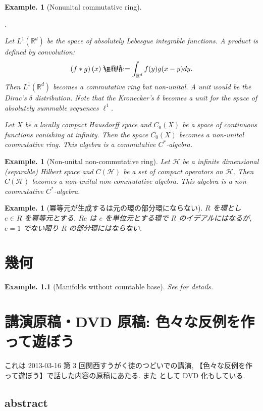 \documentclass[openany, a4paper, oneside]{jsbook}
\makeatletter
\newcounter{enum2}
\renewenvironment{enumerate}{%
\begin{list}%
{%
\arabic{enum2}.\ \,%
}%
{%
\usecounter{enum2}
\setlength{\itemindent}{0pt}%
\setlength{\leftmargin}{15pt}%
\setlength{\rightmargin}{0pt}%
\setlength{\labelsep}{0pt}%
\setlength{\labelwidth}{6pt}%
\setlength{\itemsep}{0pt}%
\setlength{\parsep}{0pt}%
\setlength{\listparindent}{0pt}%
}
}{%
\end{list}%
}
\newcommand*{\defeq}{\mathrel{\rlap{%
\raisebox{0.3ex}{$\m@th\cdot$}}%
\raisebox{-0.3ex}{$\m@th\cdot$}}%
=}
\theoremstyle{break}
\theoremstyle{breakdefn}
\newtheorem{ex}[thm]{Example.}
\newcommand{\rbk}[1]{\left (#1\right)}
\newcommand{\bbRd}{\mathbb{R}^d}
\newcommand{\calH}{\mathcal{H}}
\makeatother
\begin{document}
\begin{ex}[Nonunital commutative ring]
\begin{enumerate}
\item Let $L^1(\bbRd)$ be the space of absolutely Lebesgue integrable functions.
    A product is defined by convolution:
    \begin{align}
     \rbk{f * g} (x)
     \defeq
     \int_{\bbRd} f(y) g(x - y) dy.
    \end{align}
    Then $L^1(\bbRd)$ becomes a commutative ring but non-unital.
    A unit would be the Dirac's $\delta$ distribution.
    Note that the Kronecker's $\delta$ becomes a unit for the space of absolutely summable sequences $\ell^1$.
\item Let $X$ be a locally compact Hausdorff space and $C_0(X)$ be a space of continuous functions vanishing at infinity.
    Then the space $C_0(X)$ becomes a non-unital commutative ring.
    This algebra is a commutative $C^*$-algebra.
\end{enumerate}
\end{ex}
\begin{ex}[Non-unital non-commutative ring]
 Let $\calH$ be a infinite dimensional (separable) Hilbert space and $C \rbk{\calH}$ be a set of compact operators on $\calH$.
 Then $C (\calH)$ becomes a non-unital non-commutative algebra.
 This algebra is a non-commutative $C^*$-algebra.
\end{ex}
\begin{ex}[冪等元が生成するは元の環の部分環にならない]
 $R$ を環とし $e \in R$ を冪等元とする.
 $Re$ は $e$ を単位元とする環で $R$ のイデアルにはなるが, $e = 1$ でない限り $R$ の部分環にはならない.
\end{ex}
\chapter{幾何}


\begin{ex}[Manifolds without countable base]
 See \cite{CalabiRosenlicht1} for details.
\end{ex}
\chapter{講演原稿・DVD 原稿:  色々な反例を作って遊ぼう}


これは 2013-03-16 第 3 回関西すうがく徒のつどいでの講演,
【色々な反例を作って遊ぼう】で話した内容の原稿にあたる.
また \cite{phasetr1} として DVD 化もしている.
\section{abstract}
\end{document}
